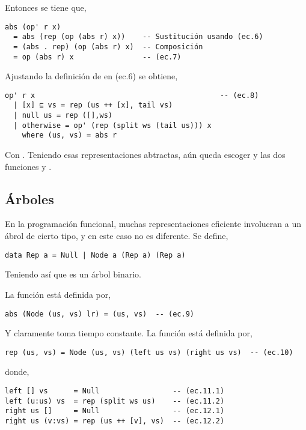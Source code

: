 Entonces se tiene que,
\begin{verbatim}
abs (op' r x) 
  = abs (rep (op (abs r) x))    -- Sustitución usando (ec.6)
  = (abs . rep) (op (abs r) x)  -- Composición
  = op (abs r) x                -- (ec.7)
\end{verbatim}

Ajustando la definición de  en (ec.6) se obtiene,
\begin{verbatim}
op' r x                                           -- (ec.8)
  | [x] ⊑ vs = rep (us ++ [x], tail vs)
  | null us = rep ([],ws)
  | otherwise = op' (rep (split ws (tail us))) x
    where (us, vs) = abs r  
\end{verbatim}

Con . Teniendo esas representaciones
abtractas, aún queda escoger  y las dos funciones  y .

\subsection{Árboles}
En la programación funcional, muchas representaciones eficiente involucran a un ábrol de cierto
tipo, y en este caso no es diferente. Se define,
\begin{verbatim}
data Rep a = Null | Node a (Rep a) (Rep a)
\end{verbatim}

Teniendo así que  es un árbol binario.

La función  está definida por,
\begin{verbatim}
abs (Node (us, vs) lr) = (us, vs)  -- (ec.9)
\end{verbatim}

Y claramente toma tiempo constante. La función  está definida por,

\begin{verbatim}
rep (us, vs) = Node (us, vs) (left us vs) (right us vs)  -- (ec.10)
\end{verbatim}

donde,
\begin{verbatim}
left [] vs      = Null                 -- (ec.11.1)
left (u:us) vs  = rep (split ws us)    -- (ec.11.2)
right us []     = Null                 -- (ec.12.1)
right us (v:vs) = rep (us ++ [v], vs)  -- (ec.12.2)
\end{verbatim}

